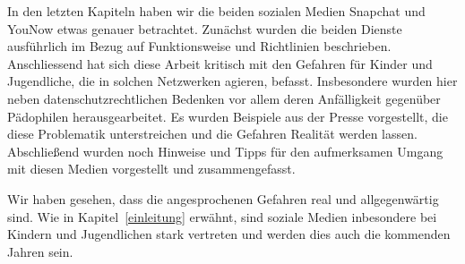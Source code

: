 In den letzten Kapiteln haben wir die beiden sozialen Medien Snapchat und
YouNow etwas genauer betrachtet. Zun\"achst wurden die beiden Dienste
ausf\"uhrlich im Bezug auf Funktionsweise und Richtlinien beschrieben.
Anschliessend hat sich diese Arbeit kritisch mit den Gefahren f\"ur Kinder und
Jugendliche, die in solchen Netzwerken agieren, befasst. Insbesondere wurden
hier neben datenschutzrechtlichen Bedenken vor allem deren Anf\"alligkeit
gegen\"uber P\"adophilen herausgearbeitet. Es wurden Beispiele aus der Presse
vorgestellt, die diese Problematik unterstreichen und die Gefahren Realit\"at
werden lassen. Abschlie{\ss}end wurden noch Hinweise und Tipps f\"ur den
aufmerksamen Umgang mit diesen Medien vorgestellt und zusammengefasst.


Wir haben gesehen, dass die angesprochenen Gefahren real und allgegenw\"artig
sind. Wie in Kapitel~\ref{einleitung} erw\"ahnt, sind soziale Medien
inbesondere bei Kindern und Jugendlichen stark vertreten und werden dies auch
die kommenden Jahren sein.
